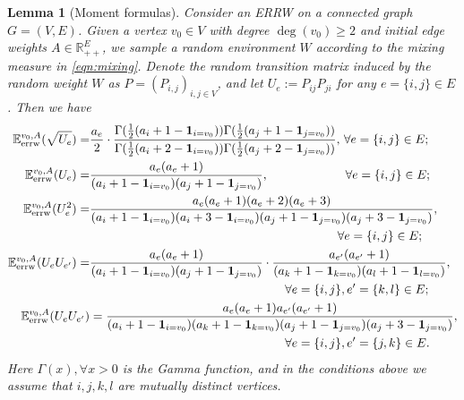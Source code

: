 \documentclass[a4paper, 11pt]{article}
\newcommand{\E}{\mathbb{E}}
\newcommand{\Eerrw}{\E_{\textnormal{errw}}}
\newcommand{\ind}{\mathbf{1}}
\newtheorem{lem}[thm]{Lemma}
\begin{document}
\vspace{.3em}
\begin{lem}[Moment formulas]
\label{lem:moment}
    Consider an ERRW on a connected graph $G=(V, E)$. Given a vertex $v_0\in V$ with degree $\deg(v_0)\geq 2$ and initial edge weights $A\in\mathbb{R}_{++}^E$, we sample a random environment $W$ according to the mixing measure in \cref{eqn:mixing}. Denote the random transition matrix induced by the random weight $W$ as $P=(P_{i,j})_{i,j\in V}$, and let $U_e:=P_{ij}P_{ji}$ for any $e=\{i,j\}\in E$. Then we have
    \begin{align*}
    \Eerrw^{v_0,A}(\sqrt{U_e})
    =& \frac{a_e}{2}\cdot \frac{\Gamma(\frac{1}{2}(a_i+1-\ind_{i=v_0}))\Gamma(\frac{1}{2}(a_j+1-\ind_{j=v_0}))}{\Gamma(\frac{1}{2}(a_i+2-\ind_{i=v_0}))\Gamma(\frac{1}{2}(a_j+2-\ind_{j=v_0}))},\, \forall e=\{i,j\}\in E;\\
    \Eerrw^{v_0,A} (U_e)
    =& \frac{a_e(a_e+1)}{(a_i+1-\ind_{i=v_0})(a_j+1-\ind_{j=v_0})}, \hspace{6.3em} \forall e=\{i,j\}\in E;\\
    \Eerrw^{v_0,A}(U_e^2)
    =& \frac{a_e(a_e+1)(a_e+2)(a_e+3)}{(a_i+1-\ind_{i=v_0})(a_i+3-\ind_{i=v_0})(a_j+1-\ind_{j=v_0})(a_j+3-\ind_{j=v_0})},\\
    & \hspace{20.3em} \forall e=\{i,j\}\in E;\\
    \Eerrw^{v_0,A} (U_e U_{e'})
    =& \frac{a_e(a_e+1)}{(a_i+1-\ind_{i=v_0})(a_j+1-\ind_{j=v_0})}\cdot \frac{a_{e'}(a_{e'}+1)}{(a_k+1-\ind_{k=v_0})(a_l+1-\ind_{l=v_0})}, \\
    & \hspace{16em} \forall e=\{i,j\}, e'=\{k,l\}\in E;\\
    \Eerrw^{v_0,A} (U_e U_{e'})
    &= \frac{a_e(a_e+1)a_{e'}(a_{e'}+1)}{(a_i+1-\ind_{i=v_0})(a_k+1-\ind_{k=v_0})(a_j+1-\ind_{j=v_0})(a_j+3-\ind_{j=v_0})}, \\
    & \hspace{16em} \forall e=\{i,j\}, e'=\{j,k\}\in E.\\
    \end{align*}
    Here $\Gamma(x), \forall x>0$ is the Gamma function, and in the conditions above we assume that $i,j,k,l$ are mutually distinct vertices.
\end{lem}
\end{document}

